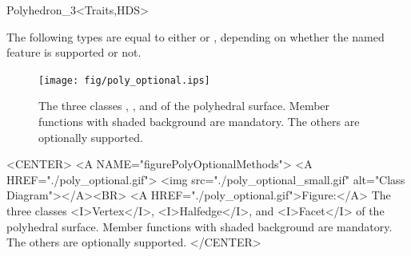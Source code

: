 \begin{ccClassTemplate}{Polyhedron_3<Traits,HDS>}
\begin{ccAdvanced}


The following types are equal to either  or
, depending on whether the named feature is
supported or not.

\ccGlue
{}
\ccGlue
{}
\ccGlue
{}
\ccGlue
{}
\ccGlue
{}
\ccGlue
{}
\ccGlue
{}
\ccGlue
{}

\end{ccAdvanced}

\end{ccClassTemplate} 


\begin{ccTexOnly}
    \begin{figure}
        \begin{center}
          \parbox{\textwidth}{%
              \texttt{[image: fig/poly\_optional.ips]}%
          }
        \end{center}
        \caption{The three classes \protect{}, 
          \protect{}, and 
          \protect{} of the polyhedral surface. Member
          functions with shaded background are mandatory. The others
          are optionally supported.}
        \label{figurePolyOptionalMethods}
    \end{figure}
\end{ccTexOnly}

\begin{ccHtmlOnly}
    <CENTER>
    <A NAME="figurePolyOptionalMethods">
    <A HREF="./poly_optional.gif">
        <img src="./poly_optional_small.gif" 
             alt="Class Diagram"></A><BR>
    <A HREF="./poly_optional.gif">Figure:</A>
    The three classes <I>Vertex</I>, <I>Halfedge</I>, and 
          <I>Facet</I> of the polyhedral surface. Member
          functions with shaded background are mandatory. The others
          are optionally supported.
    </CENTER>
\end{ccHtmlOnly}


